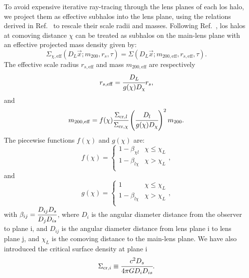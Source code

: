 To avoid expensive iterative ray-tracing through the lens planes of each \gls*{los} halo, we project them as effective subhalos into the lens plane, using the relations derived in Ref.~\cite{CaganSengul:2020nat} to rescale their scale radii and masses. Following Ref.~\cite{CaganSengul:2020nat}, \gls*{los} halos at comoving distance $\chi$ can be treated as subhalos on the main-lens plane with an effective projected mass density given by:
\begin{equation}
    \Sigma_{\chi, \mathrm{eff}}(D_L\vec{x};m_{200},r_s,\tau)= \Sigma(D_L\vec{x};m_{200,\mathrm{eff}},r_{s,\mathrm{eff}},\tau).
\end{equation}
The effective scale radius $r_{s,\mathrm{eff}}$ and mass $m_{200,\mathrm{eff}}$ are respectively
\begin{equation}
    r_{s,\mathrm{eff}}=\cfrac{D_L}{g(\chi)D_\chi}r_s,
\end{equation}
and
\begin{equation}
    m_{200,\mathrm{eff}}=f(\chi)\cfrac{\Sigma_{\mathrm{cr}, l}}{\Sigma_{\mathrm{cr}, \chi}}\left(\cfrac{D_l}{g(\chi)D_\chi}\right)^2m_{200}.
\end{equation}
The piecewise functions $f(\chi)$ and $g(\chi)$ are:
\begin{equation}
    f(\chi)= \begin{cases}
            1-\beta_{\chi l} & \chi \leq \chi_L \\
            1-\beta_{l\chi}  & \chi > \chi_L \\
            \end{cases},
\end{equation}
and
\begin{equation}
    g(\chi)= \begin{cases}
            1 & \chi \leq \chi_L \\
            1-\beta_{l\chi}  & \chi > \chi_L \\
            \end{cases},
\end{equation}
with $\beta_{ij}=\cfrac{D_{ij}D_s}{D_jD_{is}}$, where $D_i$ is the angular diameter distance from the observer to plane i, and $D_{ij}$ is the angular diameter distance from lens plane i to lens plane j, and $\chi_L$ is the comoving distance to the main-lens plane.
We have also introduced the critical surface density at plane i
\begin{equation}
    \Sigma_{\mathrm{cr}, i}\equiv \cfrac{c^2D_s}{4\pi G D_i D_{is}}.
\end{equation}

